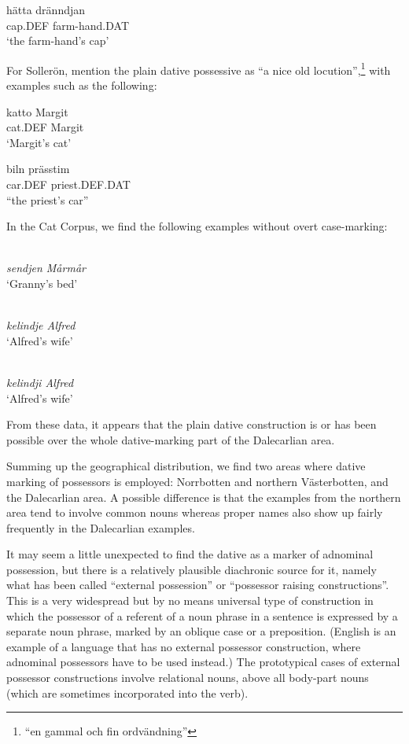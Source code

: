 \ea\label{}
\gll hätta  dränndjan\\
cap.DEF  farm-hand.DAT\\
\glt ‘the farm-hand’s cap’
\z

For Sollerön, \citet[357]{AnderssonEtAl1999} mention the plain dative possessive as “a nice old locution”,\footnote{ “en gammal och fin ordvändning”} with examples such as the following:

\ea\label{}
\gll katto  Margit\\
cat.DEF  Margit\\
\glt ‘Margit’s cat’
\z

\ea\label{}
\gll biln  prässtim\\
car.DEF  priest.DEF.DAT\\
\glt “the priest’s car”
\z

In the Cat Corpus, we find the following examples without overt case-marking:

\ea 
\ea 
{}\\
\gl \textit{sendjen Mårmår}\\
\glt ‘Granny’s bed’

\ex 
{}\\
\gl \textit{kelindje Alfred}\\
\glt ‘Alfred’s wife’

\ex 
{}\\
\gl \textit{kelindji Alfred}\\
\glt ‘Alfred’s wife’

\z 
\z



From these data, it appears that the plain dative construction is or has been possible over the whole dative-marking part of the Dalecarlian area. 

Summing up the geographical distribution, we find two areas where dative marking of possessors is employed: Norrbotten and northern Västerbotten, and the Dalecarlian area. A possible difference is that the examples from the northern area tend to involve common nouns whereas proper names also show up fairly frequently in the Dalecarlian examples. 

It may seem a little unexpected to find the dative as a marker of adnominal possession, but there is a relatively plausible diachronic source for it, namely what has been called “external possession” or “possessor raising constructions”. This is a very widespread but by no means universal type of construction in which the possessor of a referent of a noun phrase in a sentence is expressed by a separate noun phrase, marked by an oblique case or a preposition. (English is an example of a language that has no external possessor construction, where adnominal possessors have to be used instead.) The prototypical cases of external possessor constructions involve relational nouns, above all body-part nouns (which are sometimes incorporated into the verb).

